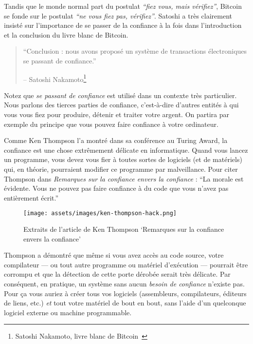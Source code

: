Tandis que le monde normal part du postulat \textit{\enquote{fiez vous, mais
vérifiez}}, Bitcoin se fonde sur le postulat \textit{\enquote{ne vous fiez pas,
vérifiez}}. Satoshi a très clairement insisté sur l'importance de se passer de
la confiance à la fois dans l'introduction et la conclusion du livre blanc de
Bitcoin.

\begin{quotation}\begin{samepage}
\enquote{Conclusion : nous avons proposé un système de transactions
électroniques se passant de confiance.}
\begin{flushright} -- Satoshi Nakamoto\footnote{Satoshi Nakamoto, livre blanc de
Bitcoin~\cite{whitepaper}}
\end{flushright}\end{samepage}\end{quotation}

Notez que \textit{se passant de confiance} est utilisé dans un contexte très
particulier. Nous parlons des tierces parties de confiance, c'est-à-dire
d'autres entités à qui vous vous fiez pour produire, détenir et traiter votre
argent. On partira par exemple du principe que vous pouvez faire confiance à
votre ordinateur.

Comme Ken Thompson l'a montré dans sa conférence au Turing Award, la confiance
est une chose extrêmement délicate en informatique. Quand vous lancez un
programme, vous devez vous fier à toutes sortes de logiciels (et de matériels)
qui, en théorie, pourraient modifier ce programme par malveillance. Pour citer
Thompson dans \textit{Remarques sur la confiance envers la confiance} :
\enquote{La morale est évidente. Vous ne pouvez pas faire confiance à du code
que vous n'avez pas entièrement écrit.}~\cite{trusting-trust}

\begin{figure}
  \texttt{[image: assets/images/ken-thompson-hack.png]}
  \caption{Extraits de l'article de Ken Thompson `Remarques sur la confiance
  envers la confiance'}
  \label{fig:ken-thompson-hack}
\end{figure}

Thompson a démontré que même si vous avez accès au code source, votre
compilateur --- ou tout autre programme ou matériel d'exécution --- pourrait
être corrompu et que la détection de cette porte dérobée serait très délicate.
Par conséquent, en pratique, un système sans aucun \textit{besoin de confiance}
n'existe pas. Pour ça vous auriez à créer tous vos logiciels (assembleurs,
compilateurs, éditeurs de liens, etc.) \textit{et} tout votre matériel de bout
en bout, sans l'aide d'un quelconque logiciel externe ou machine programmable.

